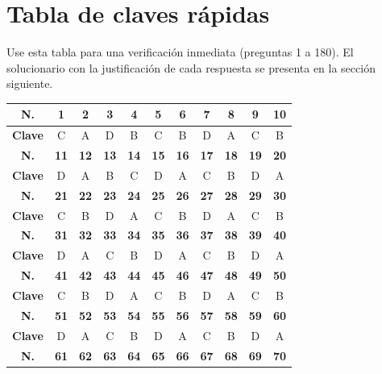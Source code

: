 \newpage
\section*{Tabla de claves rápidas}

\noindent Use esta tabla para una verificación inmediata (preguntas 1 a 180). El solucionario con la justificación de cada respuesta se presenta en la sección siguiente.

\vspace{0.35cm}
\begin{center}
\footnotesize
\renewcommand{\arraystretch}{1.25}
\begin{tabular}{|c|c|c|c|c|c|c|c|c|c|c|}
\hline
\textbf{N.} & \textbf{1} & \textbf{2} & \textbf{3} & \textbf{4} & \textbf{5} & \textbf{6} & \textbf{7} & \textbf{8} & \textbf{9} & \textbf{10} \\
\hline
\textbf{Clave} & C & A & D & B & C & B & D & A & C & B \\
\hline
\textbf{N.} & \textbf{11} & \textbf{12} & \textbf{13} & \textbf{14} & \textbf{15} & \textbf{16} & \textbf{17} & \textbf{18} & \textbf{19} & \textbf{20} \\
\hline
\textbf{Clave} & D & A & B & C & D & A & C & B & D & A \\
\hline
\textbf{N.} & \textbf{21} & \textbf{22} & \textbf{23} & \textbf{24} & \textbf{25} & \textbf{26} & \textbf{27} & \textbf{28} & \textbf{29} & \textbf{30} \\
\hline
\textbf{Clave} & C & B & D & A & C & B & D & A & C & B \\
\hline
\textbf{N.} & \textbf{31} & \textbf{32} & \textbf{33} & \textbf{34} & \textbf{35} & \textbf{36} & \textbf{37} & \textbf{38} & \textbf{39} & \textbf{40} \\
\hline
\textbf{Clave} & D & A & C & B & D & A & C & B & D & A \\
\hline
\textbf{N.} & \textbf{41} & \textbf{42} & \textbf{43} & \textbf{44} & \textbf{45} & \textbf{46} & \textbf{47} & \textbf{48} & \textbf{49} & \textbf{50} \\
\hline
\textbf{Clave} & C & B & D & A & C & B & D & A & C & B \\
\hline
\textbf{N.} & \textbf{51} & \textbf{52} & \textbf{53} & \textbf{54} & \textbf{55} & \textbf{56} & \textbf{57} & \textbf{58} & \textbf{59} & \textbf{60} \\
\hline
\textbf{Clave} & D & A & C & B & D & A & C & B & D & A \\
\hline
\textbf{N.} & \textbf{61} & \textbf{62} & \textbf{63} & \textbf{64} & \textbf{65} & \textbf{66} & \textbf{67} & \textbf{68} & \textbf{69} & \textbf{70} \\

\end{tabular}
\end{center}
